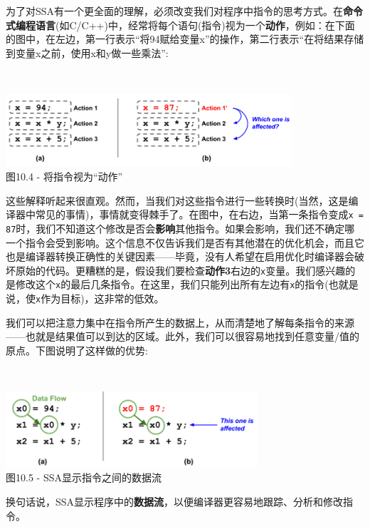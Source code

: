 为了对SSA有一个更全面的理解，必须改变我们对程序中指令的思考方式。在\textbf{命令式编程语言}(如C/C++)中，经常将每个语句(指令)视为一个\textbf{动作}，例如：在下面的图中，在左边，第一行表示“将94赋给变量x”的操作，第二行表示“在将结果存储到变量x之前，使用x和y做一些乘法”:

\hspace*{\fill} \\ %
\begin{center}
\includegraphics[width=0.8\textwidth]{content/3/chapter10/images/4.png}\\
图10.4 - 将指令视为“动作”
\end{center}

这些解释听起来很直观。然而，当我们对这些指令进行一些转换时(当然，这是编译器中常见的事情)，事情就变得棘手了。在图中，在右边，当第一条指令变成\texttt{x = 87}时，我们不知道这个修改是否会\textbf{影响}其他指令。如果会影响，我们还不确定哪一个指令会受到影响。这个信息不仅告诉我们是否有其他潜在的优化机会，而且它也是编译器转换正确性的关键因素——毕竟，没有人希望在启用优化时编译器会破坏原始的代码。更糟糕的是，假设我们要检查\textbf{动作3}右边的\texttt{x}变量。我们感兴趣的是修改这个\texttt{x}的最后几条指令。在这里，我们只能列出所有左边有\texttt{x}的指令(也就是说，使\texttt{x}作为目标)，这非常的低效。

我们可以把注意力集中在指令所产生的数据上，从而清楚地了解每条指令的来源——也就是结果值可以到达的区域。此外，我们可以很容易地找到任意变量/值的原点。下图说明了这样做的优势:

\hspace*{\fill} \\ %
\begin{center}
\includegraphics[width=0.7\textwidth]{content/3/chapter10/images/5.png}\\
图10.5 - SSA显示指令之间的数据流
\end{center}

换句话说，SSA显示程序中的\textbf{数据流}，以便编译器更容易地跟踪、分析和修改指令。

